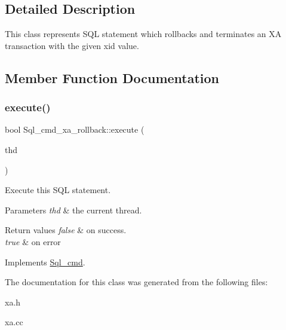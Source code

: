 \subsection{Detailed Description}
This class represents S\+QL statement which rollbacks and terminates an XA transaction with the given xid value. 

\subsection{Member Function Documentation}
\mbox{\label{classSql__cmd__xa__rollback_ab6ad1f2611953c4c083908827b1e7997}} 
\subsubsection{\texorpdfstring{execute()}{execute()}}
{\footnotesize\ttfamily bool Sql\+\_\+cmd\+\_\+xa\+\_\+rollback\+::execute (\begin{DoxyParamCaption}\item[{T\+HD $\ast$}]{thd }\end{DoxyParamCaption})\hspace{0.3cm}{\ttfamily [virtual]}}

Execute this S\+QL statement. 
\begin{DoxyParams}{Parameters}
{\em thd} & the current thread. \\
\hline
\end{DoxyParams}

\begin{DoxyRetVals}{Return values}
{\em false} & on success. \\
\hline
{\em true} & on error \\
\hline
\end{DoxyRetVals}


Implements \mbox{\hyperlink{classSql__cmd_a213367b79b551296fbb7790f2a3732fb}{Sql\+\_\+cmd}}.



The documentation for this class was generated from the following files\+:\begin{DoxyCompactItemize}
\item 
xa.\+h\item 
xa.\+cc\end{DoxyCompactItemize}
